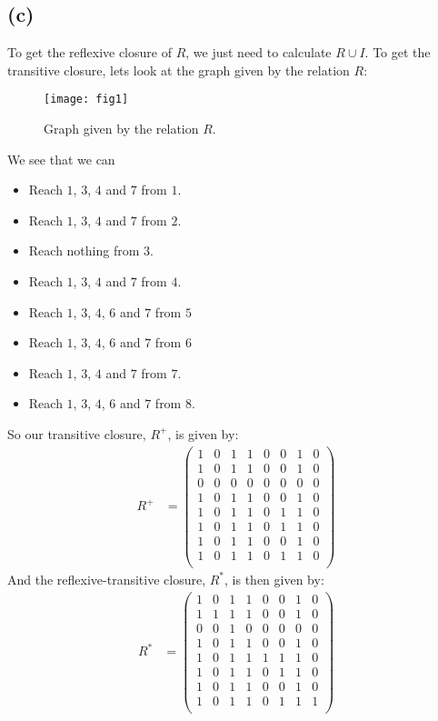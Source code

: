 \documentclass[a4paper, fleqn]{article}
\begin{document}
\subsection{(c)}
To get the reflexive closure of $R$, we just need to calculate $R\cup I$. To get the
transitive closure, lets look at the graph given by the relation $R$:
\begin{figure}[H]
  \centering
  \texttt{[image: fig1]}
  \caption{Graph given by the relation $R$.}
  \label{fig1}
\end{figure}
We see that we can
\begin{itemize}
  \item Reach $1$, $3$, $4$ and $7$ from $1$.
  \item Reach $1$, $3$, $4$ and $7$ from $2$.
  \item Reach nothing from $3$.
  \item Reach $1$, $3$, $4$ and $7$ from $4$.
  \item Reach $1$, $3$, $4$, $6$ and $7$ from $5$
  \item Reach $1$, $3$, $4$, $6$ and $7$ from $6$
  \item Reach $1$, $3$, $4$ and $7$ from $7$.
  \item Reach $1$, $3$, $4$, $6$ and $7$ from $8$.
\end{itemize}
So our transitive closure, $R^+$, is given by:
\begin{align*}
  R^+ &=
  \begin{pmatrix}
    1 & 0 & 1 & 1 & 0 & 0 & 1 & 0 \\
    1 & 0 & 1 & 1 & 0 & 0 & 1 & 0 \\
    0 & 0 & 0 & 0 & 0 & 0 & 0 & 0 \\
    1 & 0 & 1 & 1 & 0 & 0 & 1 & 0 \\
    1 & 0 & 1 & 1 & 0 & 1 & 1 & 0 \\
    1 & 0 & 1 & 1 & 0 & 1 & 1 & 0 \\
    1 & 0 & 1 & 1 & 0 & 0 & 1 & 0 \\
    1 & 0 & 1 & 1 & 0 & 1 & 1 & 0 \\
  \end{pmatrix}
\end{align*}
And the reflexive-transitive closure, $R^*$, is then given by:
\begin{align*}
  R^* &=
  \begin{pmatrix}
    1 & 0 & 1 & 1 & 0 & 0 & 1 & 0 \\
    1 & 1 & 1 & 1 & 0 & 0 & 1 & 0 \\
    0 & 0 & 1 & 0 & 0 & 0 & 0 & 0 \\
    1 & 0 & 1 & 1 & 0 & 0 & 1 & 0 \\
    1 & 0 & 1 & 1 & 1 & 1 & 1 & 0 \\
    1 & 0 & 1 & 1 & 0 & 1 & 1 & 0 \\
    1 & 0 & 1 & 1 & 0 & 0 & 1 & 0 \\
    1 & 0 & 1 & 1 & 0 & 1 & 1 & 1 \\
  \end{pmatrix}
\end{align*}
\end{document}
